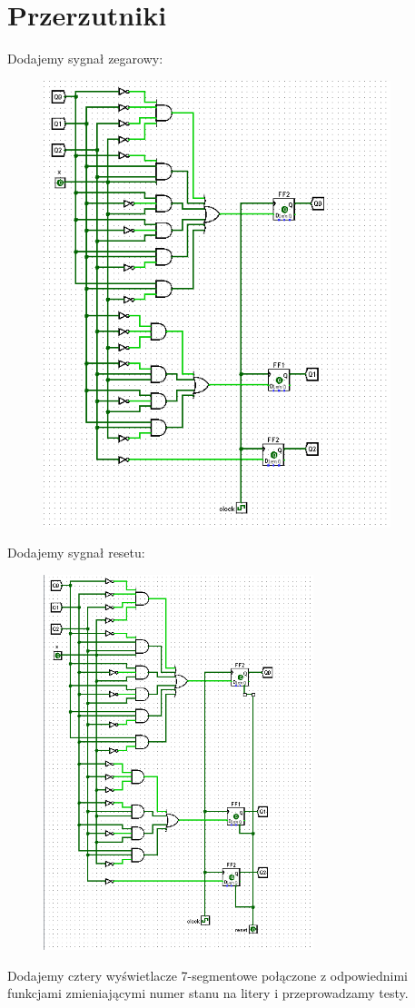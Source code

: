 \documentclass[]{article}
\begin{document}
\section{Przerzutniki}
Dodajemy sygnał zegarowy:
\begin{figure}[H]
	\centering
	\includegraphics[width=0.9\textwidth]{zegar.png}
\end{figure}
\newpage
Dodajemy  sygnał resetu:
\begin{figure}[H]
	\centering
	\includegraphics[width=0.7\textwidth]{reset.png}
\end{figure}
Dodajemy cztery wyświetlacze 7-segmentowe połączone z odpowiednimi funkcjami zmieniającymi numer stanu na litery i przeprowadzamy testy.
\newpage
\end{document}
